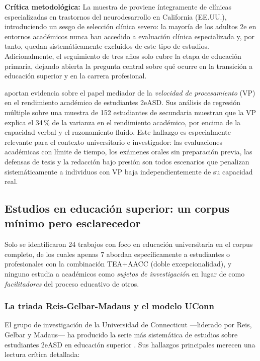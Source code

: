 \textbf{Crítica metodológica:} La muestra de \textcite{cain2019} proviene
íntegramente de clínicas especializadas en trastornos del neurodesarrollo en
California (EE.UU.), introduciendo un sesgo de selección clínica severo: la
mayoría de los adultos 2e en entornos académicos nunca han accedido a evaluación
clínica especializada y, por tanto, quedan sistemáticamente excluidos de este
tipo de estudios. Adicionalmente, el seguimiento de tres años solo cubre la
etapa de educación primaria, dejando abierta la pregunta central sobre qué
ocurre en la transición a educación superior y en la carrera profesional.

\textcite{assouline2021} aportan evidencia sobre el papel mediador de la
\textit{velocidad de procesamiento} (VP) en el rendimiento académico de
estudiantes 2eASD. Sus análisis de regresión múltiple sobre una muestra de 152
estudiantes de secundaria muestran que la VP explica el 34\,\% de la varianza
en el rendimiento académico, por encima de la capacidad verbal y el razonamiento
fluido. Este hallazgo es especialmente relevante para el contexto universitario
e investigador: las evaluaciones académicas con límite de tiempo, los exámenes
orales sin preparación previa, las defensas de tesis y la redacción bajo presión
son todos escenarios que penalizan sistemáticamente a individuos con VP baja
independientemente de su capacidad real.

\subsection{Estudios en educación superior: un corpus mínimo pero esclarecedor}

Solo se identificaron 24 trabajos con foco en educación universitaria en el
corpus completo, de los cuales apenas 7 abordan específicamente a estudiantes
o profesionales con la combinación TEA+AACC (doble excepcionalidad), y ninguno
estudia a académicos como \textit{sujetos de investigación} en lugar de como
\textit{facilitadores} del proceso educativo de otros.

\subsubsection{La triada Reis-Gelbar-Madaus y el modelo UConn}

El grupo de investigación de la Universidad de Connecticut —liderado por Reis,
Gelbar y Madaus— ha producido la serie más sistemática de estudios sobre
estudiantes 2eASD en educación superior
\parencite{reis2021, madaus2022factors, madaus2022transition, austermann2023}.
Sus hallazgos principales merecen una lectura crítica detallada:

